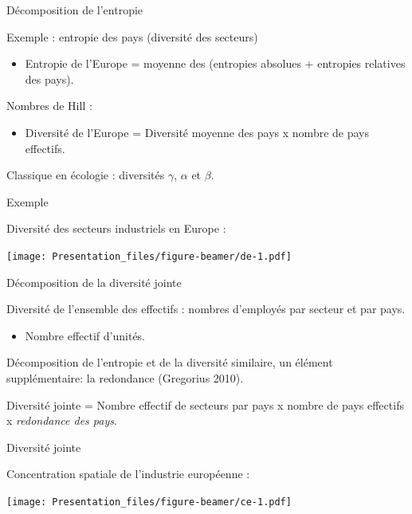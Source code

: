 \documentclass[ignorenonframetext,]{beamer}
\providecommand{\tightlist}{%
  \setlength{\itemsep}{0pt}\setlength{\parskip}{0pt}}
\begin{document}
\begin{frame}{Décomposition de l'entropie}

Exemple : entropie des pays (diversité des secteurs)

\begin{itemize}
\tightlist
\item
  Entropie de l'Europe = moyenne des (entropies absolues + entropies
  relatives des pays).
\end{itemize}

Nombres de Hill :

\begin{itemize}
\tightlist
\item
  Diversité de l'Europe = Diversité moyenne des pays x nombre de pays
  effectifs.
\end{itemize}

Classique en écologie : diversités \(\gamma\), \(\alpha\) et \(\beta\).

\end{frame}

\begin{frame}{Exemple}

Diversité des secteurs industriels en Europe :

\texttt{[image: Presentation\_files/figure-beamer/de-1.pdf]}

\end{frame}

\begin{frame}{Décomposition de la diversité jointe}

Diversité de l'ensemble des effectifs : nombres d'employés par secteur
et par pays.

\begin{itemize}
\tightlist
\item
  Nombre effectif d'unités.
\end{itemize}

Décomposition de l'entropie et de la diversité similaire, un élément
supplémentaire: la redondance (Gregorius 2010).

Diversité jointe = Nombre effectif de secteurs par pays x nombre de pays
effectifs x \emph{redondance des pays}.

\end{frame}

\begin{frame}{Diversité jointe}

Concentration spatiale de l'industrie européenne :

\texttt{[image: Presentation\_files/figure-beamer/ce-1.pdf]}

\end{frame}
\end{document}
